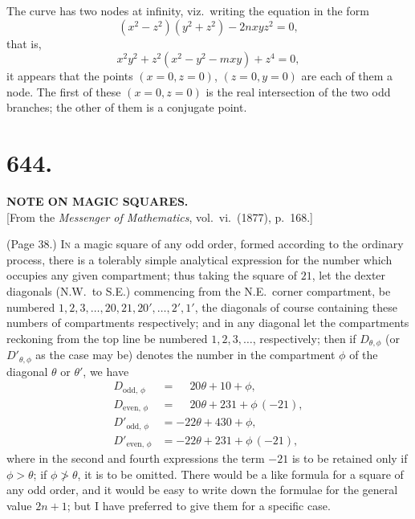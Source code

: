 \documentclass[11pt,a4paper]{article}
\begin{document}
The curve has two nodes at infinity, viz.\ writing the equation in the form
\[
(x^2 - z^2)(y^2 + z^2) - 2nxyz^2 = 0,
\]
that is,
\[
x^2 y^2 + z^2 (x^2 - y^2 - mxy) + z^4 = 0,
\]
it appears that the points $(x = 0, z = 0)$, $(z = 0, y = 0)$ are each of them a node. The first of these $(x = 0, z = 0)$ is the real intersection of the two odd branches; the other of them is a conjugate point.

\bigskip


\section*{644.}

\begin{center}
\textbf{NOTE ON MAGIC SQUARES.}\\[1em]
[From the \textit{Messenger of Mathematics}, vol.~vi.\ (1877), p.\ 168.]
\end{center}

\medskip

\noindent (Page 38.) \textsc{In} a magic square of any odd order, formed according to the ordinary process, there is a tolerably simple analytical expression for the number which occupies any given compartment; thus taking the square of $21$, let the dexter diagonals (N.W.\ to S.E.) commencing from the N.E.\ corner compartment, be numbered $1, 2, 3, \ldots, 20, 21, 20', \ldots, 2', 1'$, the diagonals of course containing these numbers of compartments respectively; and in any diagonal let the compartments reckoning from the top line be numbered $1, 2, 3, \ldots$, respectively; then if $D_{\theta,\phi}$ (or $D'_{\theta,\phi}$ as the case may be) denotes the number in the compartment $\phi$ of the diagonal $\theta$ or $\theta'$, we have
\begin{align*}
D_{\text{odd},\,\phi} &= \phantom{-} 20\theta + 10 + \phi, \\
D_{\text{even},\,\phi} &= \phantom{-} 20\theta + 231 + \phi\,(-21), \\
D'_{\text{odd},\,\phi} &= -22\theta + 430 + \phi, \\
D'_{\text{even},\,\phi} &= -22\theta + 231 + \phi\,(-21),
\end{align*}
where in the second and fourth expressions the term $-21$ is to be retained only if $\phi > \theta$; if $\phi \not> \theta$, it is to be omitted. There would be a like formula for a square of any odd order, and it would be easy to write down the formulae for the general value $2n + 1$; but I have preferred to give them for a specific case.
\end{document}
